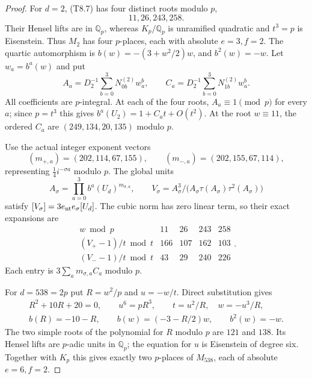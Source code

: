 \begin{proof}
For $d=2$, (T8.7) has four distinct roots modulo $p$,
\[
                           11,26,243,258.
 \tag{T8.14}
\]
Their Hensel lifts are in $\mathbb Q_p$, whereas $K_p/\mathbb Q_p$
is unramified quadratic and $t^3=p$ is Eisenstein.  Thus $M_2$
has four $p$-places, each with absolute $e=3,f=2$.
The quartic automorphism is
$b(w)=-(3+w^2/2)w$, and $b^2(w)=-w$.
Let $w_a=b^a(w)$ and put
\[
 A_a=D_2^{-1}\sum_{b=0}^3N^{(2)}_{0b}w_a^b,\qquad
 C_a=D_2^{-1}\sum_{b=0}^3N^{(2)}_{1b}w_a^b.
 \tag{T8.15}
\]
All coefficients are $p$-integral.  At each of the four roots,
$A_a\equiv1\pmod p$ for every $a$; since $p=t^3$ this gives
$b^a(U_2)=1+C_at+O(t^2)$.
At the root $w\equiv11$, the ordered $C_a$ are
$(249,134,20,135)$ modulo $p$.

Use the actual integer exponent vectors
\[
 (m_{+,a})=(202,114,67,155),\qquad
 (m_{-,a})=(202,155,67,114),
 \tag{T8.16}
\]
representing $\tfrac14i^{-\sigma a}$ modulo $p$.  The global units
\[
 A_\sigma=\prod_{a=0}^3 b^a(U_d)^{m_{\sigma,a}},\qquad
 V_\sigma=A_\sigma^3/
                 \bigl(A_\sigma\tau(A_\sigma)\tau^2(A_\sigma)\bigr)
 \tag{T8.17}
\]
satisfy $[V_\sigma]=3e_{\rm nt}e_\sigma[U_d]$.
The cubic norm has zero linear term, so their exact expansions are
\[
\begin{array}{c|rrrr}
 w\bmod p&11&26&243&258\\ \hline
 (V_+-1)/t\bmod t&166&107&162&103\\
 (V_--1)/t\bmod t&43&29&240&226
\end{array}.
 \tag{T8.18}
\]
Each entry is $3\sum_am_{\sigma,a}C_a$ modulo $p$.

For $d=538=2p$ put $R=w^2/p$ and $u=-w/t$.  Direct substitution gives
\[
 \begin{gathered}
 R^2+10R+20=0,\qquad u^6=pR^3,\qquad t=u^2/R,\quad w=-u^3/R,\\
 b(R)=-10-R,\qquad b(w)=(-3-R/2)w,\qquad b^2(w)=-w.
 \end{gathered}\tag{T8.19}
\]
The two simple roots of the polynomial for $R$ modulo $p$ are
$121$ and $138$.  Its Hensel lifts are $p$-adic units in
$\mathbb Q_p$; the equation for $u$ is Eisenstein of degree six.
Together with $K_p$ this gives exactly two $p$-places of $M_{538}$,
each of absolute $e=6,f=2$.


\end{proof}
